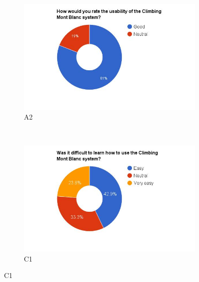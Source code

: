 \begin{figure}
    \centering
    \begin{subfigure}[h]{0.45\textwidth}
        \centerline{\includegraphics[width=1.5\textwidth]{results/usability_cmb.jpg}}
        \caption{A2}
        \label{fig:cmb-usability}
    \end{subfigure}
    ~ %
    \hfill
    \begin{subfigure}[h]{0.45\textwidth}
        \centerline{\includegraphics[width=1.5\textwidth]{results/learn_cmb.jpg}}
        \caption{C1}
        \label{fig:cmb-learn}
    \end{subfigure}


\end{figure}
